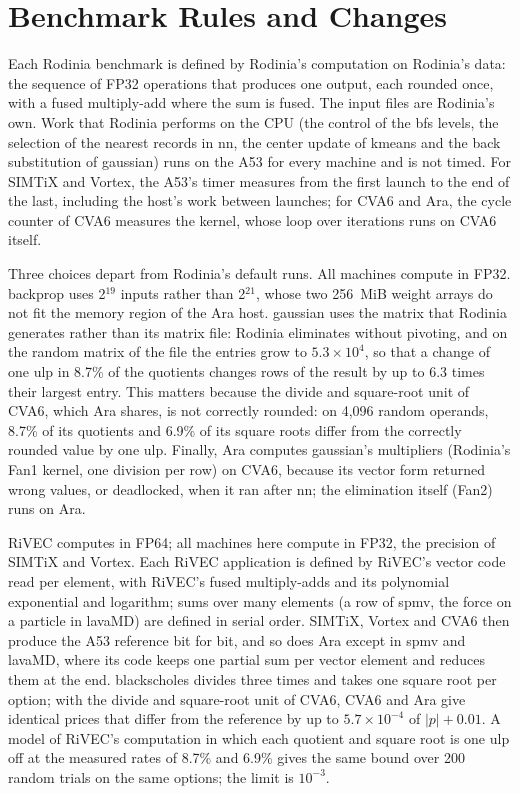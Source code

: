 
\section{Benchmark Rules and Changes}\label{sup:bench}
Each Rodinia benchmark is defined by Rodinia's computation on Rodinia's data: the
sequence of FP32 operations that produces one output, each rounded once, with a fused
multiply-add where the sum is fused. The input files are Rodinia's own. Work that
Rodinia performs on the CPU (the control of the bfs levels, the selection of the nearest
records in nn, the center update of kmeans and the back substitution of gaussian) runs
on the A53 for every machine and is not timed. For SIMTiX and Vortex, the A53's timer
measures from the first launch to the end of the last, including the host's work
between launches; for CVA6 and Ara, the cycle counter of CVA6 measures the kernel,
whose loop over iterations runs on CVA6 itself.

Three choices depart from Rodinia's default runs. All machines compute in FP32.
backprop uses 2$^{19}$ inputs rather than 2$^{21}$, whose two 256~MiB weight arrays do
not fit the memory region of the Ara host. gaussian uses the matrix that Rodinia
generates rather than its matrix file: Rodinia eliminates without pivoting, and on the
random matrix of the file the entries grow to $5.3\times10^{4}$, so that a change of one
ulp in 8.7\% of the quotients changes rows of the result by up to 6.3 times their
largest entry. This matters because the divide and square-root unit of CVA6, which Ara
shares, is not correctly rounded: on 4,096 random operands, 8.7\% of its quotients and
6.9\% of its square roots differ from the correctly rounded value by one ulp. Finally,
Ara computes gaussian's multipliers (Rodinia's Fan1 kernel, one division per row) on
CVA6, because its vector form returned wrong values, or deadlocked, when it ran after
nn; the elimination itself (Fan2) runs on Ara.

RiVEC computes in FP64; all machines here compute in FP32, the precision of SIMTiX and
Vortex. Each RiVEC application is defined by RiVEC's vector code read per element, with
RiVEC's fused multiply-adds and its polynomial exponential and logarithm; sums over many
elements (a row of spmv, the force on a particle in lavaMD) are defined in serial
order. SIMTiX, Vortex and CVA6 then produce the A53 reference bit for bit, and so does
Ara except in spmv and lavaMD, where its code keeps one partial sum per vector element
and reduces them at the end. blackscholes divides three times and takes one square root
per option; with the divide and square-root unit of CVA6, CVA6 and Ara give identical
prices that differ from the reference by up to $5.7\times10^{-4}$ of $|p|+0.01$. A model
of RiVEC's computation in which each quotient and square root is one ulp off at the
measured rates of 8.7\% and 6.9\% gives the same bound over 200 random trials on the
same options; the limit is $10^{-3}$.

